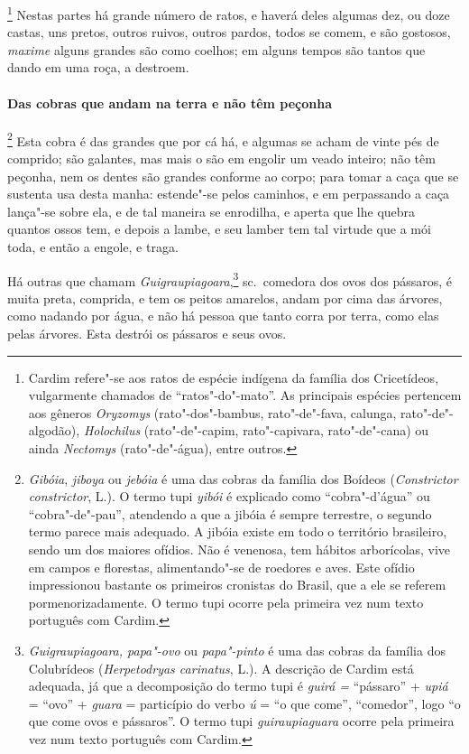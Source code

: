 \footnote{ Cardim refere"-se aos ratos de espécie
indígena da família dos Cricetídeos, vulgarmente chamados de ``ratos"-do"-mato''. 
As principais espécies pertencem aos gêneros
\textit{Oryzomys} (rato"-dos"-bambus, rato"-de"-fava, calunga,
rato"-de"-algodão), \textit{Holochilus} (rato"-de"-capim, rato"-capivara,
rato"-de"-cana) ou ainda \textit{Nectomys} (rato"-de"-água), entre
outros.} Nestas partes há grande número de ratos, e
haverá deles algumas dez, ou doze castas, uns pretos, outros ruivos,
outros pardos, todos se comem, e são gostosos, \textit{maxime} alguns
grandes são como coelhos; em alguns tempos são tantos que dando em uma
roça, a destroem. 

\paragraph{Das cobras que andam na terra e não têm peçonha}

\footnote{ \textit{Gibóia}, \textit{jiboya} ou 
\textit{jebóia} é uma das cobras da família dos Boídeos 
(\textit{Constrictor constrictor}, L.). O termo tupi \textit{yibói} é
explicado como ``cobra"-d'água'' ou ``cobra"-de"-pau'', atendendo a que a
jibóia é sempre terrestre, o segundo termo parece mais adequado. A
jibóia existe em todo o território brasileiro, sendo um dos maiores
ofídios. Não é venenosa, tem hábitos arborícolas, vive em campos e
florestas, alimentando"-se de roedores e aves. Este ofídio impressionou
bastante os primeiros cronistas do Brasil, que a ele se referem
pormenorizadamente. O termo tupi ocorre pela primeira vez num texto
português com Cardim.} Esta cobra é das grandes que por cá há,
e algumas se acham de vinte pés de comprido; são galantes, mas mais o
são em engolir um veado inteiro; não têm peçonha, nem os dentes são
grandes conforme ao corpo; para tomar a caça que se sustenta usa desta
manha: estende"-se pelos caminhos, e em perpassando a caça lança"-se
sobre ela, e de tal maneira se enrodilha, e aperta que lhe quebra
quantos ossos tem, e depois a lambe, e seu lamber tem tal virtude que a
mói toda, e então a engole, e traga. 

 Há outras que chamam \textit{Guigraupiagoara},\footnote{ \textit{Guigraupiagoara, 
papa"-ovo} ou \textit{papa"-pinto} é uma das
cobras da família dos Colubrídeos (\textit{Herpetodryas carinatus}, L.). 
A descrição de Cardim está adequada, já que a decomposição do
termo tupi é \textit{guirá =} ``pássaro'' + \textit{upiá} = ``ovo'' +
\textit{guara} = particípio do verbo \textit{ú} = ``o que come'',
``comedor'', logo ``o que come ovos e pássaros''. O termo tupi
\textit{guiraupiaguara} ocorre pela primeira vez num texto português
com Cardim.} sc.~comedora dos ovos dos pássaros, é muita preta,
comprida, e tem os peitos amarelos, andam por cima das árvores, como
nadando por água, e não há pessoa que tanto corra por terra, como elas
pelas árvores. Esta destrói os pássaros e seus ovos.

